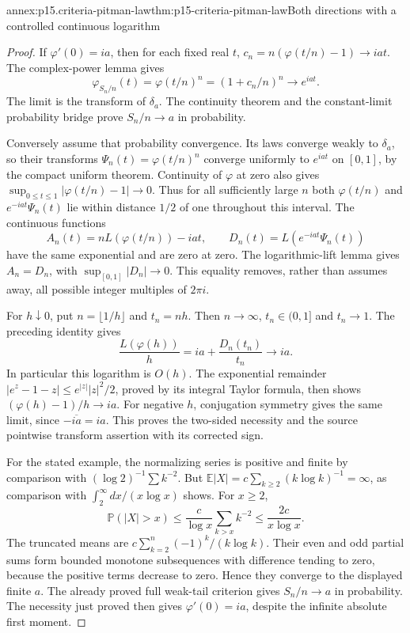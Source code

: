 \begin{annexitem}{annex:p15.criteria-pitman-law}{thm:p15-criteria-pitman-law}{Both directions with a controlled continuous logarithm}
\begin{proof}
If \(\varphi'(0)=ia\), then for each fixed real \(t\),
\(c_n=n(\varphi(t/n)-1)\to iat\).
The complex-power lemma gives
\[
 \varphi_{S_n/n}(t)=\varphi(t/n)^n=(1+c_n/n)^n\to e^{iat}.
\]
The limit is the transform of \(\delta_a\).
The continuity theorem and the constant-limit probability
bridge prove \(S_n/n\to a\) in probability.

Conversely assume that probability convergence.
Its laws converge weakly to \(\delta_a\), so their transforms
\(\Psi_n(t)=\varphi(t/n)^n\) converge uniformly to \(e^{iat}\)
on \([0,1]\), by the compact uniform theorem.
Continuity of \(\varphi\) at zero also gives
\(\sup_{0\leq t\leq1}|\varphi(t/n)-1|\to0\).
Thus for all sufficiently large \(n\) both
\(\varphi(t/n)\) and \(e^{-iat}\Psi_n(t)\) lie within
distance \(1/2\) of one throughout this interval.
The continuous functions
\[
 A_n(t)=nL(\varphi(t/n))-iat,\qquad
 D_n(t)=L(e^{-iat}\Psi_n(t))
\]
have the same exponential and are zero at zero.
The logarithmic-lift lemma gives \(A_n=D_n\), with
\(\sup_{[0,1]}|D_n|\to0\).
This equality removes, rather than assumes away, all
possible integer multiples of \(2\pi i\).

For \(h\downarrow0\), put \(n=\lfloor1/h\rfloor\)
and \(t_n=nh\). Then \(n\to\infty\), \(t_n\in(0,1]\)
and \(t_n\to1\). The preceding identity gives
\[
 \frac{L(\varphi(h))}{h}
          =ia+\frac{D_n(t_n)}{t_n}\longrightarrow ia.
\]
In particular this logarithm is \(O(h)\).
The exponential remainder
\(|e^z-1-z|\leq e^{|z|}|z|^2/2\), proved by its integral
Taylor formula, then shows
\((\varphi(h)-1)/h\to ia\).
For negative \(h\), conjugation symmetry gives the same
limit, since \(-\overline{ia}=ia\).
This proves the two-sided necessity and the source
pointwise transform assertion with its corrected sign.

For the stated example, the normalizing series is positive
and finite by comparison with \((\log2)^{-1}\sum k^{-2}\).
But \(\mathbb E|X|=c\sum_{k\geq2}(k\log k)^{-1}=\infty\),
as comparison with \(\int_2^\infty dx/(x\log x)\) shows.
For \(x\geq2\),
\[
 \mathbb P(|X|>x)
 \leq\frac{c}{\log x}\sum_{k>x}k^{-2}
 \leq\frac{2c}{x\log x}.
\]
The truncated means are
\(c\sum_{k=2}^n(-1)^k/(k\log k)\).
Their even and odd partial sums form bounded monotone
subsequences with difference tending to zero, because
the positive terms decrease to zero. Hence they converge
to the displayed finite \(a\).
The already proved full weak-tail criterion gives
\(S_n/n\to a\) in probability. The necessity just proved
then gives \(\varphi'(0)=ia\), despite the infinite
absolute first moment.
\end{proof}
\end{annexitem}

